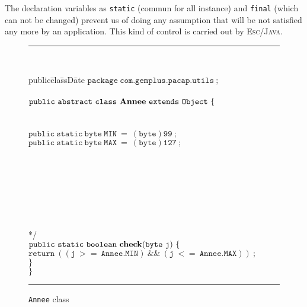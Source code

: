 The declaration variables as \texttt{static} (commun for all instance)
and \texttt{final} (which can not be changed) prevent us of doing
any assumption that will be not satisfied any more by an
application. This kind of control is carried out by
\textsc{Esc/Java}. \\


\begin{center}
\begin{figure}[htb]
\rule{\linewidth}{0.3mm}
\\[2.0ex]
\begin{tabbing}
pub\=lic\=cla\=ssD\=ate  \kill
$\mathtt{package\ com.gemplus.pacap.utils\ ;}$ \\
 \\
$\mathtt{public\ abstract\ class\ {\bf Annee}\ extends\ Object\ \{}$ \\
 \\
 \\ 
\>$\mathtt{public\ static\ byte\ MIN\ =\ (byte)99\ ;} $\\
\>$\mathtt{public\ static\ byte\ MAX\ =\ (byte)127\ ;} $\\
\\
\\
 \\
\> \\
\> \\
\> \\
\> \\
\>*/ \\
\>$\mathtt{public\ static\ boolean\ {\bf check}(byte\ j)\ \{} $ \\
\>\>$\mathtt{return\ ((j\ >=\ Annee.MIN)\ \&\&\ (j\ <=\ Annee.MAX))\ ;}$  \\
\>$\mathtt{\}} $ \\
$\mathtt{\}} $ \\
\end{tabbing}
\caption{{\tt Annee} class}
\label{fig-cla-ann}
\rule{\linewidth}{0.3mm}
\end{figure}
\end{center}





